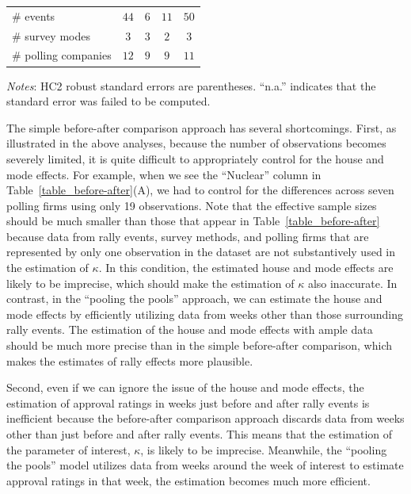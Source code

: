 \documentclass[12pt,letterpaper]{scrartcl}
\begin{document}
\begin{table}[t]
\begin{minipage}{\hsize}
\begin{tabular}{lcccc}
\# events & $44$ & $6$ & $11$ & $50$ \\
\# survey modes & $3$ & $3$ & $2$ & $3$ \\
\# polling companies & $12$ & $9$ & $9$ & $11$ \\\bottomrule
\end{tabular}
\end{minipage}
\begin{minipage}{\hsize}
\bigskip
\small
\emph{Notes}: HC2 robust standard errors are parentheses. ``n.a.'' indicates that the standard error was failed to be computed.
\end{minipage}
\end{table}

The simple before-after comparison approach has several shortcomings. First, as illustrated in the above analyses, because the number of observations becomes severely limited, it is quite difficult to appropriately control for the house and mode effects. For example, when we see the ``Nuclear'' column in Table~\ref{table_before-after}(A), we had to control for the differences across seven polling firms using only 19 observations. Note that the effective sample sizes should be much smaller than those that appear in Table~\ref{table_before-after} because data from rally events, survey methods, and polling firms that are represented by only one observation in the dataset are not substantively used in the estimation of $\kappa $. In this condition, the estimated house and mode effects are likely to be imprecise, which should make the estimation of $\kappa $ also inaccurate. In contrast, in the ``pooling the pools'' approach, we can estimate the house and mode effects by efficiently utilizing data from weeks other than those surrounding rally events. The estimation of the house and mode effects with ample data should be much more precise than in the simple before-after comparison, which makes the estimates of rally effects more plausible.

Second, even if we can ignore the issue of the house and mode effects, the estimation of approval ratings in weeks just before and after rally events is inefficient because the before-after comparison approach discards data from weeks other than just before and after rally events. This means that the estimation of the parameter of interest, $\kappa $, is likely to be imprecise. Meanwhile, the ``pooling the pools'' model utilizes data from weeks around the week of interest to estimate approval ratings in that week, the estimation becomes much more efficient.
\end{document}
